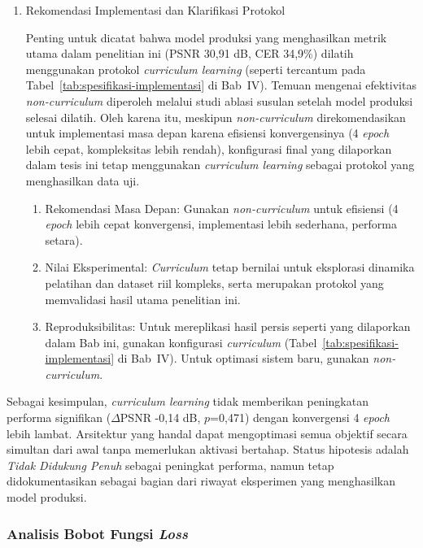 \documentclass[12pt,a4paper]{article}
\begin{document}
\begin{enumerate}[leftmargin=1.5em, labelsep=0.5em, itemindent=0pt, label=\arabic*., topsep=0pt, partopsep=0pt]
    \item Rekomendasi Implementasi dan Klarifikasi Protokol
    
    Penting untuk dicatat bahwa model produksi yang menghasilkan metrik utama dalam penelitian ini (PSNR 30,91 dB, CER 34,9\%) dilatih menggunakan protokol \textit{curriculum learning} (seperti tercantum pada Tabel~\ref{tab:spesifikasi-implementasi} di Bab~IV). Temuan mengenai efektivitas \textit{non-curriculum} diperoleh melalui studi ablasi susulan setelah model produksi selesai dilatih. Oleh karena itu, meskipun \textit{non-curriculum} direkomendasikan untuk implementasi masa depan karena efisiensi konvergensinya (4 \textit{epoch} lebih cepat, kompleksitas lebih rendah), konfigurasi final yang dilaporkan dalam tesis ini tetap menggunakan \textit{curriculum learning} sebagai protokol yang menghasilkan data uji.

    \begin{enumerate}[leftmargin=1.5em, labelsep=0.5em, itemindent=0pt, noitemsep, topsep=0pt, label=\alph*)]
        \item Rekomendasi Masa Depan: Gunakan \textit{non-curriculum} untuk efisiensi (4 \textit{epoch} lebih cepat konvergensi, implementasi lebih sederhana, performa setara).

        \item Nilai Eksperimental: \textit{Curriculum} tetap bernilai untuk eksplorasi dinamika pelatihan dan dataset riil kompleks, serta merupakan protokol yang memvalidasi hasil utama penelitian ini.

        \item Reproduksibilitas: Untuk mereplikasi hasil persis seperti yang dilaporkan dalam Bab ini, gunakan konfigurasi \textit{curriculum} (Tabel~\ref{tab:spesifikasi-implementasi} di Bab~IV). Untuk optimasi sistem baru, gunakan \textit{non-curriculum}.
    \end{enumerate}
\end{enumerate}

Sebagai kesimpulan, \textit{curriculum learning} tidak memberikan peningkatan performa signifikan ($\Delta$PSNR -0,14 dB, $p$=0,471) dengan konvergensi 4 \textit{epoch} lebih lambat. Arsitektur yang handal dapat mengoptimasi semua objektif secara simultan dari awal tanpa memerlukan aktivasi bertahap. Status hipotesis adalah \textit{Tidak Didukung Penuh} sebagai peningkat performa, namun tetap didokumentasikan sebagai bagian dari riwayat eksperimen yang menghasilkan model produksi.

\subsubsection{Analisis Bobot Fungsi \textit{Loss}}
\label{subsubsec:optimasi-loss-weights}
\end{document}
